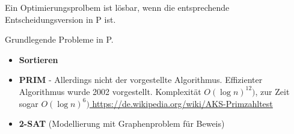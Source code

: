 \documentclass{article} %
\begin{document}
Ein Optimierungsprolbem ist lösbar, wenn die entsprechende Entscheidungsversion in P ist.

Grundlegende Probleme in P.
\begin{itemize}
\item\textbf{Sortieren}
\item\textbf{PRIM} - Allerdings nicht der vorgestellte Algorithmus. Effizienter Algorithmus wurde 2002 vorgestellt. Komplexität $O(\log n)^{12})$, zur Zeit sogar $O(\log n)^{6})$\url{ https://de.wikipedia.org/wiki/AKS-Primzahltest}
\item\textbf{2-SAT}  (Modellierung mit Graphenproblem für Beweis)
\end{itemize}



\end{document}
